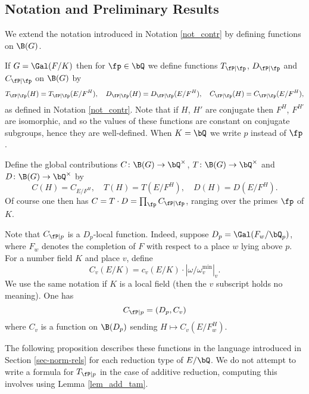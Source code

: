 \subsection{Notation and Preliminary Results}

We extend the notation introduced in Notation \ref{not_contr} by defining functions on $\B(G)$. 

\begin{notation}\label{not_contr_fns}
    If $G = \Gal(F / K)$ then for $\fp \in \bQ$ we define functions $T_{\fP \mid \fp}$, $D_{\fP \mid \fp}$ and $C_{\fP \mid \fp}$ on $\B(G)$ by 
    \[ T_{\fP \mid \fp}(H) = T_{\fP \mid \fp}(E / F^H), \quad D_{\fP \mid \fp}(H) = D_{\fP \mid \fp}(E / F^H), \quad C_{\fP \mid \fp}(H) = C_{\fP \mid \fp}(E / F^H), \]
    as defined in Notation \ref{not_contr}.
    Note that if $H$, $H'$ are conjugate then $F^H$, $F^{H'}$ are isomorphic, and so the values of these functions are constant on conjugate subgroups, hence they are well-defined. When $K = \bQ$ we write $p$ instead of $\fp$. 
    
    Define the global contributions $C \colon \B(G) \to \bQ^{\times}$, $T \colon \B(G) \to \bQ^{\times}$ and $D \colon \B(G) \to \bQ^{\times}$ by 
    \[ C(H) = C_{E / F^H}, \quad T(H) = T(E / F^H), \quad D(H) = D(E / F^H). \] 
    Of course one then has $C = T \cdot D = \prod_{\fp} C_{\fP \mid \fp}$, ranging over the primes $\fp$ of $K$. 
\end{notation}

\begin{rem}\label{Rem-C-D-loc}
Note that $C_{\fP \mid p}$ is a $D_p$-local function. Indeed, suppose $D_p = \Gal(F_w / \bQ_p)$, where $F_w$ denotes the completion of $F$ with respect to a place $w$ lying above $p$. For a number field $K$ and place $v$, define $$C_v(E / K) = c_v(E / K) \cdot \left| \omega / \omega_v^{\min} \right|_v.$$ We use the same notation if $K$ is a local field (then the $v$ subscript holds no meaning).
One has
\begin{equation*}
    C_{\fP \mid p} = (D_p, C_v)
\end{equation*}
where $C_v$ is a function on $\B(D_p)$ sending $H \mapsto C_v(E / F_w^H)$.
\end{rem}

The following proposition describes these functions in the language introduced in Section \ref{sec-norm-rels} for each reduction type of $E / \bQ$. We do not attempt to write a formula for $T_{\fP \mid p}$ in the case of additive reduction, computing this involves using Lemma \ref{lem_add_tam}.

